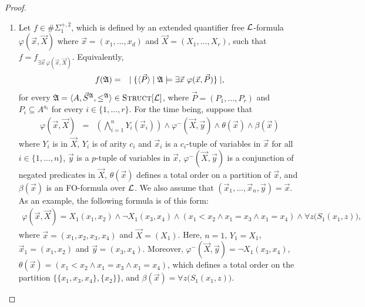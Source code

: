 \documentclass[12pt]{article}
\def\Eb{\#\Sigma_1^{+,2}}
\def\Truc{\textsc{Struct}[\L]}
\def\A{{\frak A}}
\def\L{{\cal L}}
\def\P{\vec{P}}
\def\S{\vec{S}}
\def\X{\vec{X}}
\def\x{\vec{x}} %
\def\y{\vec{y}} %
\begin{document}
\begin{proof}
\begin{enumerate}

\item Let $f \in \Eb$, which is defined by an extended quantifier free $\L$-formula $\varphi(\x,\X)$ where $\x = (x_1,\dots,x_d)$ and $\X = (X_1,\dots,X_r)$, such that $f = f_{\exists \x \: \varphi(\x,\X)}$. Equivalently,
\begin{eqnarray*}
f(\A) &=& \mid \{ \langle\P\rangle \mid \A \models \exists \x \ \varphi(\x,\P) \} \mid \label{f1},
\end{eqnarray*}
for every $\A = \langle A, \S^{\A}, \leq^{\A} \rangle \in \Truc$, where $\P = (P_1,\ldots,P_r)$ and $P_i \subseteq A^{a_i}$ for every $i \in \{1,\ldots,r\}$. For the time being, suppose that
\begin{eqnarray}
\varphi(\x,\X) &=& \left( \bigwedge_{i=1}^n Y_i(\x_i) \right) \wedge \varphi^{-}(\X,\y) \wedge \theta(\x) \wedge \beta(\x)
\end{eqnarray}
where $Y_i$ is in $\X$, $Y_i$ is of arity $c_i$ and $\x_i$ is a $c_i$-tuple of variables in $\x$ for all $i \in \{1,\dots,n\}$, $\y$ is a $p$-tuple of variables in $\x$, $\varphi^{-}(\X,\y)$ is a conjunction of negated predicates in $\X$, $\theta(\x)$ defines a total order on a partition of $\x$, and $\beta(\x)$ is an FO-formula over $\L$. We also assume that $(\x_1,\dots,\x_n,\y) = \x$. As an example, the following formula is of this form:
\begin{align*}
\varphi(\x,\X) =  X_1(x_1,x_2) \wedge \neg X_1(x_3,x_4) \wedge (x_1 < x_2 \wedge x_1 = x_3 \wedge x_1 = x_4 ) \wedge \forall z\big( S_1(x_1,z) \big),
\end{align*}
where $\x = (x_1,x_2,x_3,x_4)$ and $\X = (X_1)$. Here, $n = 1$, $Y_1 = X_1$, $\x_1 = (x_1,x_2)$ and $\y = (x_3,x_4)$. Moreover, $\varphi^{-}(\X,\y) = \neg X_1(x_3,x_4)$, $\theta(\x) = (x_1 < x_2 \wedge x_1 = x_3 \wedge x_1 = x_4)$, which defines a total order on the partition $\{\{x_1,x_3,x_4\},\{x_2\}\}$, and $\beta(\x) = \forall z\big( S_1(x_1,z) \big)$.


\end{enumerate}
\end{proof}
\end{document}
